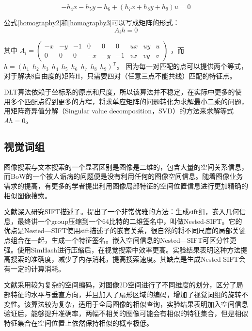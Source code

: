 \begin{equation}
\label{homography3}
-h_4x - h_5y - h_6 + (h_7x+h_8y+h_9)u = 0
\end{equation}

公式\eqref{homography2}和\eqref{homography3}可以写成矩阵的形式：
\begin{equation}
\label{homography4}
A_ih = 0
\end{equation}

其中
\(A_i = 
\begin{pmatrix}
-x & -y & -1 & 0 & 0 & 0 &ux & uy & u \\
0 & 0 & 0 & -x & -y & -1 &vx & vy & v 
\end{pmatrix}\)
，而
\(h = (h_1 \ \ h_2 \ \ h_3 \ \ h_4 \ \ h_5 \ \ h_6 \ \ h_7 \ \ h_8 \ \ h_9)^\mathrm{T}\)。
因为每一对匹配的点可以提供两个等式，对于解决8自由度的矩阵H，只需要四对（任意三点不能共线）匹配的特征点。

DLT算法依赖于坐标系的原点和尺度，所以该算法并不稳定，在实际中更多的使用多个匹配点得到更多的方程，将求单应矩阵的问题转化为求解最小二乘的问题，用矩阵奇异值分解（Singular value decomposition，SVD）的方法来求解等式\(Ah = 0\)。

\subsection{视觉词组}

图像搜索与文本搜索的一个显著区别是图像是二维的，包含大量的空间关系信息，而BoW的一个被人诟病的问题便是没有利用任何的图像空间信息。随着图像业务需求的提高，有更多的学者提出利用图像局部特征的空间位置信息进行更加精确的相似图像搜索\cite{Philbin:2007fk,Wu:2009bl,Zhou:2010tv,Zhou:2013jz,Xu:2013wc}。

文献\cite{Xu:2013wc}深入研究SIFT描述子。提出了一个非常优雅的方法：生成sift组，嵌入几何信息，最终讲一个group压缩到一个64比特的二维签名中，叫做Nested-SIFT。它的优点是Nested—SIFT使用sift描述子的嵌套关系，很自然的将不同尺度的局部关键点组合在一起，生成一个特征签名。嵌入空间信息的Nested—SIFT可区分性更强。使用SimHash进行压缩后，在视觉搜索中效率更高。实验结果表明这种方法提高搜索的准确度，减少了内存消耗，提高搜索速度。其缺点是生成Nested-SIFT会有一定的计算消耗。

文献\cite{Zhou:2013jz}采用较为复杂的空间编码，对图像2D空间进行了不同维度的划分，区分了局部特征的水平与垂直方向，并且加入了扇形区域的编码，增加了视觉词组的旋转不变性。该算法较为复杂，适用于全局图像的相似查询，实验结果表明加入空间信息验证后，能够提升准确率，两幅不相关的图像可能会有相似的特征集合，但是相似特征集合在空间位置上依然保持相似的概率极低。

